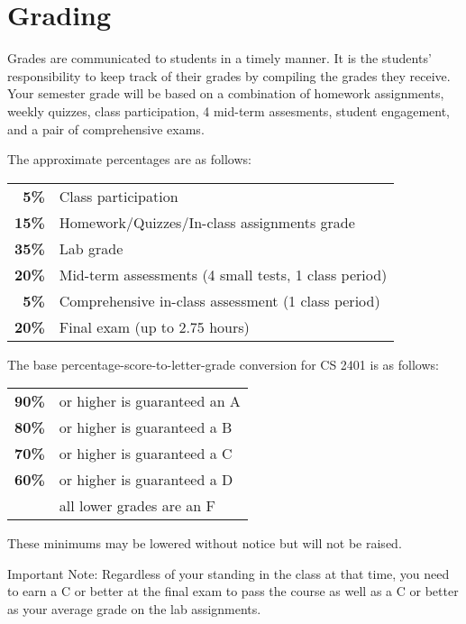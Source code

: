 \documentclass[12pt]{scrartcl}
\begin{document}
\section{Grading}

Grades are communicated to students in a timely manner. 
It is the students’ responsibility to keep track of their grades by compiling the grades they receive. 
Your semester grade will be based on a combination of homework assignments, weekly quizzes, class participation, 4 mid-term assesments, student engagement, and a pair of  comprehensive exams. 

\clearpage 
The approximate percentages are as follows:
\begin{center}
\begin{tabular}{rl}
\textbf{5\% } & Class participation \\
\textbf{15\% } & Homework/Quizzes/In-class assignments grade\\
\textbf{35\% } & Lab grade\\
\textbf{20\% } & Mid-term assessments (4 small tests, 1 class period) \\
\textbf{5\% } & Comprehensive in-class assessment (1 class period)\\
\textbf{20\% } & Final exam (up to 2.75 hours)\\
\end{tabular}
\end{center}
The base percentage-score-to-letter-grade conversion for CS 2401 is as follows: 

\begin{center}
\begin{tabular}{rl}
\textbf{90\%}& or higher is guaranteed an A \\
\textbf{80\%}& or higher is guaranteed a B \\
\textbf{70\%}& or higher is guaranteed a C \\
\textbf{60\%}& or higher is guaranteed a D \\
\textbf{}& all lower grades are an F 
\end{tabular}
\end{center}
These minimums may be lowered without notice but will not be raised. 

{\color{red} Important Note:} 
Regardless of your standing in the class at that time, you need to earn a C or better at the final exam to pass the course as well as a C or better as your average grade on the lab assignments. 
\end{document}

